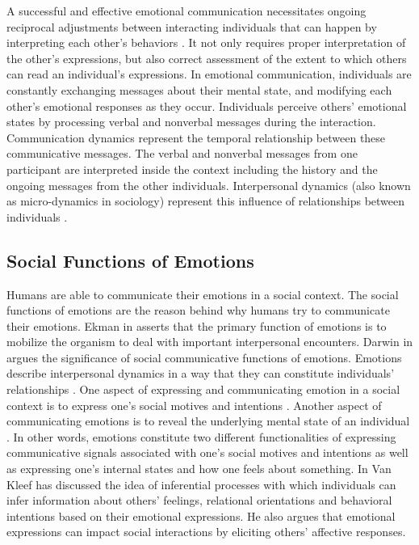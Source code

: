 \documentclass[12pt]{report}
\begin{document}
A successful and effective emotional communication necessitates ongoing
reciprocal adjustments between interacting individuals that can happen by
interpreting each other's behaviors \cite{parkinson:emotion-social-interaction}.
It not only requires proper interpretation of the other's expressions, but also
correct assessment of the extent to which others can read an individual's
expressions. In emotional communication, individuals are constantly exchanging
messages about their mental state, and modifying each other's emotional
responses as they occur. Individuals perceive others' emotional states by
processing verbal and nonverbal messages during the interaction. Communication
dynamics represent the temporal relationship between these communicative
messages. The verbal and nonverbal messages from one participant are interpreted
inside the context including the history and the ongoing messages from the other
individuals. Interpersonal dynamics (also known as micro-dynamics in sociology)
represent this influence of relationships between individuals
\cite{louis:communication-dynamic}.

\subsection{Social Functions of Emotions}
\label{section-emotion-social-functions}

Humans are able to communicate their emotions in a social context. The social
functions of emotions are the reason behind why humans try to communicate their
emotions. Ekman in \cite{ekman:argument-emotions} asserts that the primary
function of emotions is to mobilize the organism to deal with important
interpersonal encounters. Darwin in \cite{darwin:emotion-expression} argues the
significance of social communicative functions of emotions. Emotions describe
interpersonal dynamics in a way that they can constitute individuals'
relationships \cite{parkinson:emotions-social, tiedens:social-life}. One aspect
of expressing and communicating emotion in a social context is to express one's
social motives and intentions \cite{hess:darwin-emotion}. Another aspect of
communicating emotions is to reveal the underlying mental state of an
individual \cite{parkinson:emotion-communication}. In other words, emotions
constitute two different functionalities of expressing communicative signals
associated with one's social motives and intentions as well as expressing one's
internal states and how one feels about something. In
\cite{kleef:emotion-regulate-social} Van Kleef has discussed the idea of
inferential processes with which individuals can infer information about others'
feelings, relational orientations and behavioral intentions based on their
emotional expressions. He also argues that emotional expressions can impact
social interactions by eliciting others' affective responses.
\end{document}
